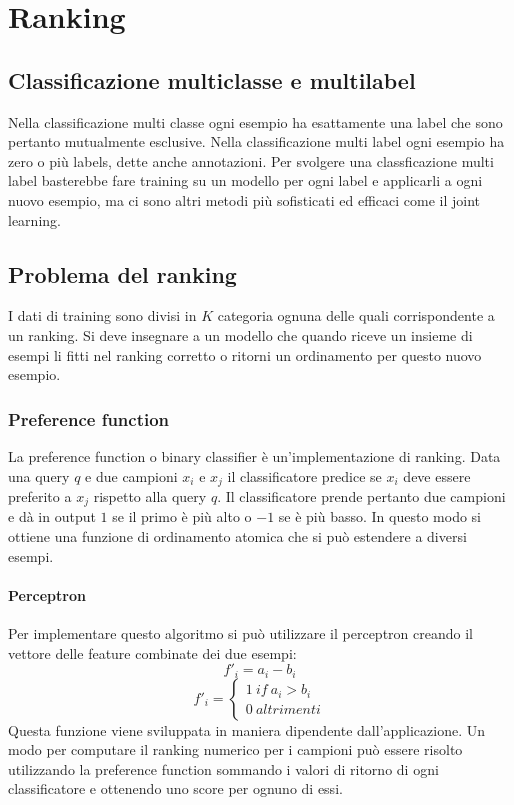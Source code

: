 \chapter{Ranking}

\section{Classificazione multiclasse e multilabel}
Nella classificazione multi classe ogni esempio ha esattamente una label che sono pertanto mutualmente esclusive.
Nella classificazione multi label ogni esempio ha zero o pi\`u labels, dette anche annotazioni.
Per svolgere una classficazione multi label basterebbe fare training su un modello per ogni label e applicarli a ogni nuovo esempio, ma ci sono altri metodi pi\`u sofisticati ed efficaci come il joint learning.

\section{Problema del ranking}
I dati di training sono divisi in $K$ categoria ognuna delle quali corrispondente a un ranking.
Si deve insegnare a un modello che quando riceve un insieme di esempi li fitti nel ranking corretto o ritorni un ordinamento per questo nuovo esempio.

	\subsection{Preference function}
	La preference function o binary classifier \`e un'implementazione di ranking.
	Data una query $q$ e due campioni $x_i$ e $x_j$ il classificatore predice se $x_i$ deve essere preferito a $x_j$ rispetto alla query $q$.
	Il classificatore prende pertanto due campioni e d\`a in output $1$ se il primo \`e pi\`u alto o $-1$ se \`e pi\`u basso.
	In questo modo si ottiene una funzione di ordinamento atomica che si pu\`o estendere a diversi esempi.

		\subsubsection{Perceptron}
		Per implementare questo algoritmo si pu\`o utilizzare il perceptron creando il vettore delle feature combinate dei due esempi:
		$$f'_i = a_i -b_i$$
		$$f'_i = \begin{cases}1\ if\ a_i > b_i\\0\ altrimenti\end{cases}$$
		Questa funzione viene sviluppata in maniera dipendente dall'applicazione.
		Un modo per computare il ranking numerico per i campioni pu\`o essere risolto utilizzando la preference function sommando i valori di ritorno di ogni classificatore e ottenendo uno score per ognuno di essi.

